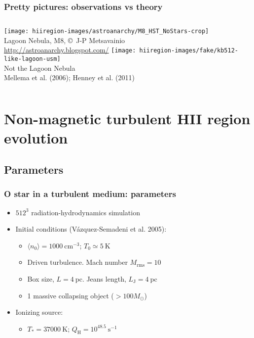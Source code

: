 \documentclass{beamer}
\newcommand\Ref[1]{\textcolor{white!70!black!90!yellow}{#1}}
\begin{document}
\begin{frame}
  \frametitle{Pretty pictures: observations vs theory}
  \begin{columns}
    \texttt{[image: hiiregion-images/astroanarchy/M8\_HST\_NoStars-crop]}\\
    \tiny
    \smallskip
    Lagoon Nebula, M8, \copyright\, J-P Metsavainio\\ \url{http://astroanarchy.blogspot.com/}
    \texttt{[image: hiiregion-images/fake/kb512-like-lagoon-usm]}\\
    \tiny
    \smallskip
    \alert{Not} the Lagoon Nebula\\
    \Ref{Mellema et al. (2006)}; \Ref{Henney et al. (2011)}
  \end{columns}
\end{frame}

\section{Non-magnetic turbulent HII region evolution}

\subsection{Parameters}
\begin{frame}\frametitle{O star in a turbulent medium: parameters}
\linespread{1.3}\selectfont
\begin{itemize}
\item $512^3$ radiation-hydrodynamics simulation
\item Initial conditions (\Ref{V\'azquez-Semadeni et al. 2005}):
\begin{itemize}
  \item $\langle n_0 \rangle = 1000~\mathrm{cm}^{-3}$; $T_0 \simeq 5~\mathrm{K}$
  \item Driven turbulence. Mach number $M_\mathrm{rms} = 10$
  \item Box size, $L = 4~\mathrm{pc}$. Jeans length, $L_\mathrm{J} = 4~\mathrm{pc}$ 
  \item 1 massive collapsing object (\(> 100 M_\odot\))
\end{itemize}
\item Ionizing source:
\begin{itemize}
  \item $T_* = 37000~\mathrm{K}$; $Q_\mathrm{H} = 10^{48.5}~\mathrm{s}^{-1}$
\end{itemize}
\end{itemize}
\end{frame}
\end{document}
